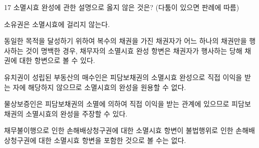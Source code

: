 \begin{question}{17}
소멸시효 완성에 관한 설명으로 옳지 않은 것은? (다툼이 있으면 판례에 따름)
\begin{choices}
  \item 소유권은 소멸시효에 걸리지 않는다.
  \item 동일한 목적을 달성하기 위하여 복수의 채권을 가진 채권자가 어느 하나의 채권만을 행사하는 것이 명백한 경우, 채무자의 소멸시효 완성 항변은 채권자가 행사하는 당해 채권에 대한 항변으로 볼 수 있다.
  \item 유치권이 성립된 부동산의 매수인은 피담보채권의 소멸시효 완성으로 직접 이익을 받는 자에 해당하지 않으므로 소멸시효의 완성을 원용할 수 없다.
  \item 물상보증인은 피담보채권의 소멸에 의하여 직접 이익을 받는 관계에 있으므로 피담보채권의 소멸시효의 완성을 주장할 수 있다.
  \item 채무불이행으로 인한 손해배상청구권에 대한 소멸시효 항변이 불법행위로 인한 손해배상청구권에 대한 소멸시효 항변을 포함한 것으로 볼 수는 없다.
\end{choices}
\end{question}
